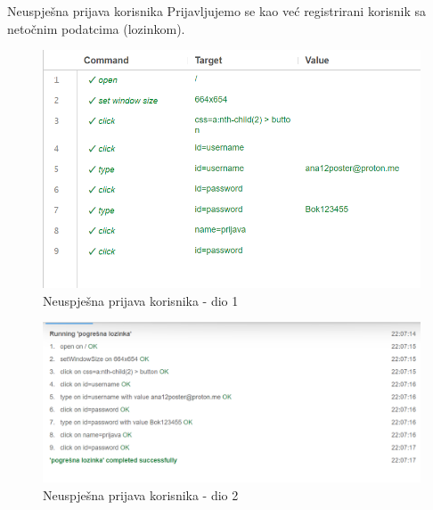 			
    

		   \item Neuspješna prijava korisnika
		   Prijavljujemo se kao već registrirani korisnik sa netočnim podatcima (lozinkom).
		   \begin{figure}[H]
		   	\includegraphics[scale=0.30]{slike/deploy/fTest1a.png}
		   	\centering
		   	\caption{Neuspješna prijava korisnika - dio 1}
		   	\label{fig:fTest1a}
		   \end{figure}
		   \begin{figure}[H]
		   	\includegraphics[scale=0.30]{slike/deploy/fTest1b.png}
		   	\centering
		   	\caption{Neuspješna prijava korisnika - dio 2}
		   	\label{fig:fTest1b}
		   \end{figure}
		   
